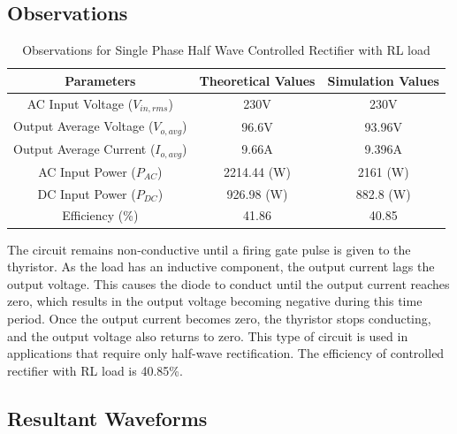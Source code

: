 \subsection{Observations}

\begin{table}[h]
    \renewcommand{\arraystretch}{1.3}
    \label{table_observation_6}
    \centering
    \begin{tabular}{|c|c|c|}
        \hline
        Parameters                              & Theoretical Values & Simulation Values \\
        \hline
        \hline
        AC Input Voltage ($ V_{in,rms} $)       & 230V               & 230V              \\
        \hline
        Output Average Voltage ($ V_{o,avg} $)  & 96.6V              & 93.96V            \\
        \hline
        Output Average Current ($ I_{o,avg}  $) & 9.66A              & 9.396A            \\
        \hline
        AC Input Power ($ P_{AC}  $)            & 2214.44 (W)        & 2161 (W)          \\
        \hline
        DC Input Power ($ P_{DC}  $)            & 926.98 (W)         & 882.8 (W)         \\
        \hline
        Efficiency (\%)                         & 41.86              & 40.85             \\
        \hline
    \end{tabular}
    \caption{Observations for Single Phase Half Wave Controlled Rectifier with RL load}

\end{table}


 The circuit remains non-conductive until a firing gate pulse is given to the thyristor. As the load has an inductive component, the output current lags the output voltage. This causes the diode to conduct until the output current reaches zero, which results in the output voltage becoming negative during this time period. Once the output current becomes zero, the thyristor stops conducting, and the output voltage also returns to zero. This type of circuit is used in applications that require only half-wave rectification.
The efficiency of controlled
rectifier with RL load is 40.85\%.



\subsection{Resultant Waveforms}

